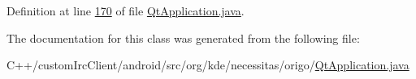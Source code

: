 Definition at line \hyperlink{_qt_application_8java_source_l00170}{170} of file \hyperlink{_qt_application_8java_source}{Qt\-Application.\-java}.



The documentation for this class was generated from the following file\-:\begin{DoxyCompactItemize}
\item 
C++/custom\-Irc\-Client/android/src/org/kde/necessitas/origo/\hyperlink{_qt_application_8java}{Qt\-Application.\-java}\end{DoxyCompactItemize}
